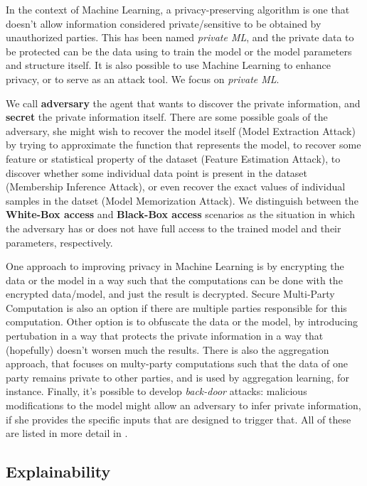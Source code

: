 In the context of Machine Learning, a privacy-preserving algorithm is one that doesn't allow information considered private/sensitive to be obtained by unauthorized parties. This has been named \emph{private ML}\cite{liu2021machine}, and the private data to be protected can be the data using to train the model or the model parameters and structure itself. It is also possible to use Machine Learning to enhance privacy, or to serve as an attack tool. We focus on \emph{private ML}. 

We call \textbf{adversary} the agent that wants to discover the private information, and \textbf{secret} the private information itself. There are some possible goals of the adversary, she might wish to recover the model itself (Model Extraction Attack) by trying to approximate the function that represents the model, to recover some feature or statistical property of the dataset (Feature Estimation Attack), to discover whether some individual data point is present in the dataset (Membership Inference Attack), or even recover the exact values of individual samples in the datset (Model Memorization Attack). We distinguish between the \textbf{White-Box access} and \textbf{Black-Box access} scenarios as the situation in which the adversary has or does not have full access to the trained model and their parameters, respectively.

One approach to improving privacy in Machine Learning is by encrypting the data or the model in a way such that the computations can be done with the encrypted data/model, and just the result is decrypted. Secure Multi-Party Computation is also an option if there are multiple parties responsible for this computation. Other option is to obfuscate the data or the model, by introducing pertubation in a way that protects the private information in a way that (hopefully) doesn't worsen much the results. There is also the aggregation approach, that focuses on multy-party computations such that the data of one party remains private to other parties, and is used by aggregation learning, for instance. Finally, it's possible to develop \emph{back-door} attacks: malicious modifications to the model might allow an adversary to infer private information, if she provides the specific inputs that are designed to trigger that. All of these are listed in more detail in \cite{liu2021machine}.


\subsection{Explainability}


